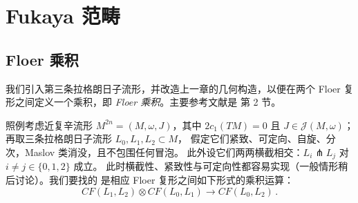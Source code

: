 \section{Fukaya 范畴}\label{ch:06}

\setcounter{equation}{77}


\subsection{Floer 乘积}\label{sec:6.1}

我们引入第三条拉格朗日子流形，并改造上一章的几何构造，以便在两个 Floer
复形之间定义一个乘积，即 \emph{Floer 乘积}。主要参考文献是 \cite{Aur13}
第 2 节。

照例考虑近复辛流形 $M^{2n}=(M,\omega,J)$，其中 $2c_1(TM)=0$ 且
$J\in\mathcal J(M,\omega)$；再取三条拉格朗日子流形 $L_0,L_1,L_2\subset M$，
假定它们紧致、可定向、自旋、分次，Maslov 类消没，且不包围任何冒泡。
此外设它们两两横截相交：$L_i\pitchfork L_j$ 对 $i\neq j\in\{0,1,2\}$ 成立。
此时横截性、紧致性与可定向性都容易实现（一般情形稍后讨论）。我们要找的
是相应 Floer 复形之间如下形式的乘积运算：
\[
CF(L_1,L_2)\otimes CF(L_0,L_1)\longrightarrow CF(L_0,L_2)\,.
\]

